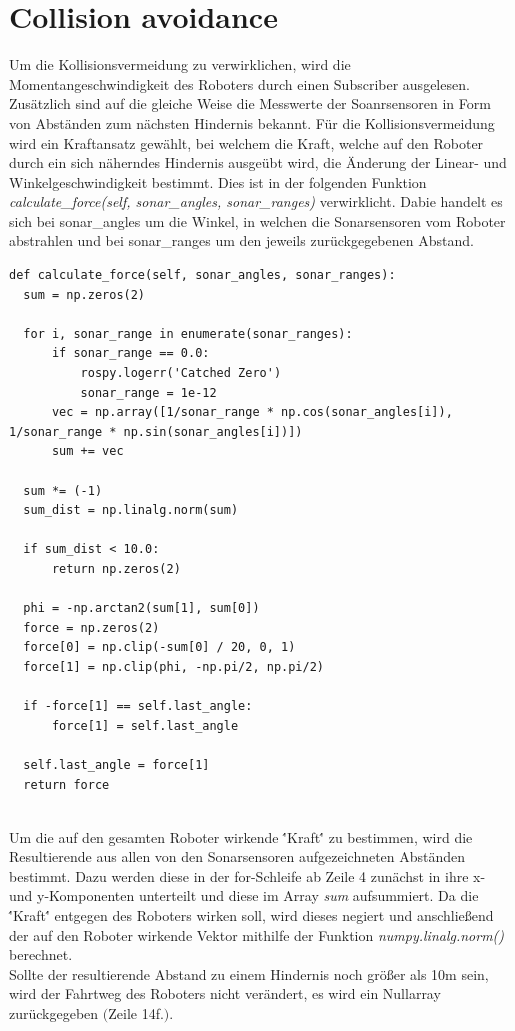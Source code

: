 \documentclass[12pt, a4paper]{report}
\begin{document}
\section{Collision avoidance}
Um die Kollisionsvermeidung zu verwirklichen, wird die Momentangeschwindigkeit des Roboters durch einen Subscriber ausgelesen. Zusätzlich sind auf die gleiche Weise die Messwerte der Soanrsensoren in Form von Abständen zum nächsten Hindernis bekannt.
Für die Kollisionsvermeidung wird ein Kraftansatz gewählt, bei welchem die Kraft, welche auf den Roboter durch ein sich näherndes Hindernis ausgeübt wird, die Änderung der Linear- und Winkelgeschwindigkeit bestimmt. Dies ist in der folgenden Funktion \textit{calculate\_force(self, sonar\_angles, sonar\_ranges)} verwirklicht. Dabie handelt es sich bei sonar\_angles um die Winkel, in welchen die Sonarsensoren vom Roboter abstrahlen und bei sonar\_ranges um den jeweils zurückgegebenen Abstand.
\begin{lstlisting}
def calculate_force(self, sonar_angles, sonar_ranges):
  sum = np.zeros(2)

  for i, sonar_range in enumerate(sonar_ranges):
      if sonar_range == 0.0:
          rospy.logerr('Catched Zero')
          sonar_range = 1e-12
      vec = np.array([1/sonar_range * np.cos(sonar_angles[i]), 1/sonar_range * np.sin(sonar_angles[i])])
      sum += vec
          
  sum *= (-1)
  sum_dist = np.linalg.norm(sum)
       
  if sum_dist < 10.0:
      return np.zeros(2)

  phi = -np.arctan2(sum[1], sum[0])
  force = np.zeros(2)
  force[0] = np.clip(-sum[0] / 20, 0, 1)
  force[1] = np.clip(phi, -np.pi/2, np.pi/2)

  if -force[1] == self.last_angle:
      force[1] = self.last_angle

  self.last_angle = force[1]
  return force
  
\end{lstlisting}
Um die auf den gesamten Roboter wirkende \''Kraft\'' zu bestimmen, wird die Resultierende aus allen von den Sonarsensoren aufgezeichneten Abständen bestimmt. Dazu werden diese in der for-Schleife ab Zeile 4 zunächst in ihre x- und y-Komponenten unterteilt und diese im Array \textit{sum} aufsummiert. Da die \''Kraft\'' entgegen des Roboters wirken soll, wird dieses negiert und anschließend der auf den Roboter wirkende Vektor mithilfe der Funktion \textit{numpy.linalg.norm()} berechnet.\\
Sollte der resultierende Abstand zu einem Hindernis noch größer als 10m sein, wird der Fahrtweg des Roboters nicht verändert, es wird ein Nullarray zurückgegeben $($Zeile 14f.$)$.\\
\end{document}
